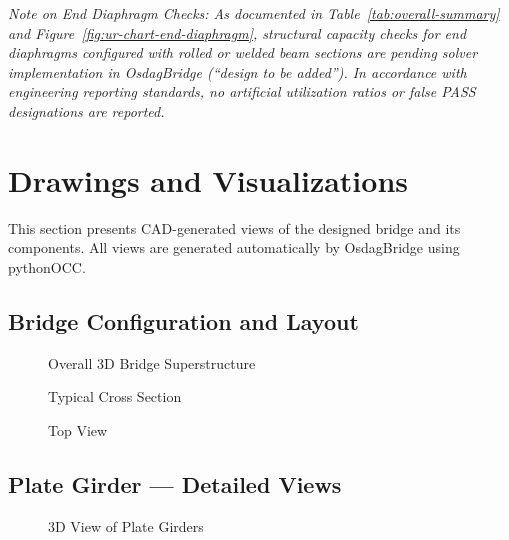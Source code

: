 \documentclass[12pt,a4paper]{report}
\numberwithin{table}{chapter}
\numberwithin{figure}{chapter}
\begin{document}
\noindent\textit{Note on End Diaphragm Checks: As documented in Table~\ref{tab:overall-summary} and Figure~\ref{fig:ur-chart-end-diaphragm}, structural capacity checks for end diaphragms configured with rolled or welded beam sections are pending solver implementation in OsdagBridge (``design to be added''). In accordance with engineering reporting standards, no artificial utilization ratios or false PASS designations are reported.}


\chapter{Drawings and Visualizations}
\label{ch:drawings}

This section presents CAD-generated views of the designed bridge and its components. All views are generated automatically by OsdagBridge using pythonOCC.

\section{Bridge Configuration and Layout}
\label{sec:bridge-layout}

\begin{figure}[H]
\centering
{}
\caption{Overall 3D Bridge Superstructure}
\label{fig:bridge-3d}
\end{figure}


\begin{figure}[H]
\centering
{}
\caption{Typical Cross Section}
\label{fig:cross-section}
\end{figure}


\begin{figure}[H]
\centering
{}
\caption{Top View}
\label{fig:top-view}
\end{figure}


\section{Plate Girder --- Detailed Views}
\label{sec:girder-views}

\begin{figure}[H]
\centering
{}
\caption{3D View of Plate Girders}
\label{fig:girder-3d}
\end{figure}
\end{document}
